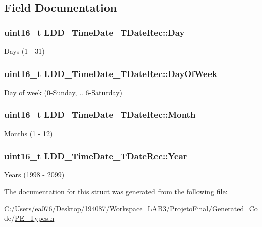 \subsection{Field Documentation}
\hypertarget{struct_l_d_d___time_date___t_date_rec_a6f1463c1917d6fe55a492bdb85a6bd17}{
\subsubsection[{Day}]{\setlength{\rightskip}{0pt plus 5cm}uint16\-\_\-t L\-D\-D\-\_\-\-Time\-Date\-\_\-\-T\-Date\-Rec\-::\-Day}}\label{struct_l_d_d___time_date___t_date_rec_a6f1463c1917d6fe55a492bdb85a6bd17}
Days (1 -\/ 31) \hypertarget{struct_l_d_d___time_date___t_date_rec_a11ed8bc2e3fbd80252a7d4802d316f1c}{
\subsubsection[{Day\-Of\-Week}]{\setlength{\rightskip}{0pt plus 5cm}uint16\-\_\-t L\-D\-D\-\_\-\-Time\-Date\-\_\-\-T\-Date\-Rec\-::\-Day\-Of\-Week}}\label{struct_l_d_d___time_date___t_date_rec_a11ed8bc2e3fbd80252a7d4802d316f1c}
Day of week (0-\/\-Sunday, .. 6-\/\-Saturday) \hypertarget{struct_l_d_d___time_date___t_date_rec_a28aaeffe98b07d60db379d12269fa822}{
\subsubsection[{Month}]{\setlength{\rightskip}{0pt plus 5cm}uint16\-\_\-t L\-D\-D\-\_\-\-Time\-Date\-\_\-\-T\-Date\-Rec\-::\-Month}}\label{struct_l_d_d___time_date___t_date_rec_a28aaeffe98b07d60db379d12269fa822}
Months (1 -\/ 12) \hypertarget{struct_l_d_d___time_date___t_date_rec_a58eee644efb4f46adc3437063c7bc194}{
\subsubsection[{Year}]{\setlength{\rightskip}{0pt plus 5cm}uint16\-\_\-t L\-D\-D\-\_\-\-Time\-Date\-\_\-\-T\-Date\-Rec\-::\-Year}}\label{struct_l_d_d___time_date___t_date_rec_a58eee644efb4f46adc3437063c7bc194}
Years (1998 -\/ 2099) 

The documentation for this struct was generated from the following file\-:\begin{DoxyCompactItemize}
\item 
C\-:/\-Users/ea076/\-Desktop/194087/\-Workspace\-\_\-\-L\-A\-B3/\-Projeto\-Final/\-Generated\-\_\-\-Code/\hyperlink{_p_e___types_8h}{P\-E\-\_\-\-Types.\-h}\end{DoxyCompactItemize}

